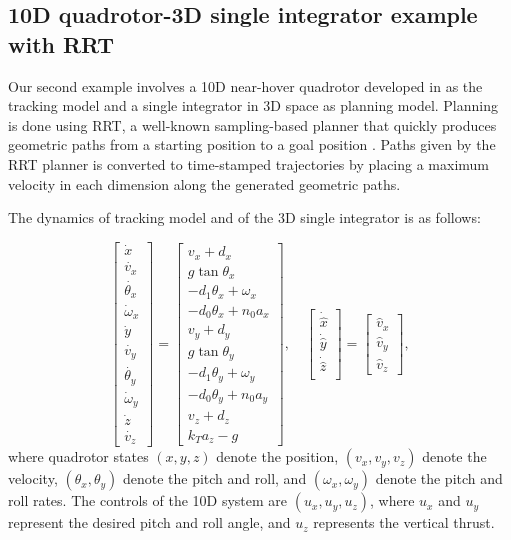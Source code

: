 \subsection{10D quadrotor-3D single integrator example with RRT\label{sec:resultsRRT}}

Our second example involves a 10D near-hover quadrotor developed in \cite{Bouffard12} as the tracking model and a single integrator in 3D space as planning model.
Planning is done using RRT, a well-known sampling-based planner that quickly produces geometric paths from a starting position to a goal position \cite{Kuffner2000,Kavraki1996}.
Paths given by the RRT planner is converted to time-stamped trajectories by placing a maximum velocity in each dimension along the generated geometric paths.

The dynamics of tracking model and of the 3D single integrator is as follows:

\begin{equation}
\label{eq:Quad10D_dyn}
\begin{bmatrix}
\dot{x}\\
\dot{v_x}\\
\dot{\theta_x}\\
\dot\omega_x\\
\dot{y}\\
\dot{v_y}\\
\dot{\theta_y}\\
\dot\omega_y\\
\dot{z}\\
\dot{v_z}
\end{bmatrix}
=
\begin{bmatrix}
v_x + d_x\\
g \tan \theta_x\\
-d_1 \theta_x + \omega_x\\
-d_0 \theta_x + n_0 a_x\\
v_y + d_y\\
g \tan \theta_y\\
-d_1 \theta_y + \omega_y\\
-d_0 \theta_y + n_0 a_y\\
v_z + d_z\\
k_T a_z - g
\end{bmatrix}, \quad
\begin{bmatrix}
\dot{\hat x}\\
\dot{\hat y}\\
\dot{\hat z}\\
\end{bmatrix} =
\begin{bmatrix}
\hat v_x \\
\hat v_y \\
\hat v_z
\end{bmatrix},
\end{equation}
\noindent where quadrotor states $(x, y, z)$ denote the position, $(v_x, v_y, v_z)$ denote the velocity, $(\theta_x, \theta_y)$ denote the pitch and roll, and $(\omega_x, \omega_y)$ denote the pitch and roll rates. 
The controls of the 10D system are $(u_x, u_y, u_z)$, where $u_x$ and $u_y$ represent the desired pitch and roll angle, and $u_z$ represents the vertical thrust.

